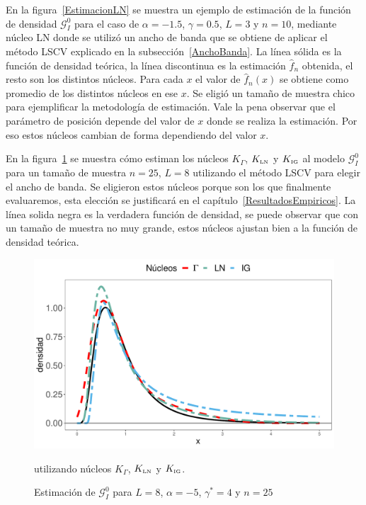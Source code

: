 En la figura~\ref{EstimacionLN} se muestra un ejemplo de estimación de la función de densidad $\mathcal{G}_I^0$ para el caso de $\alpha=-1.5$, $\gamma=0.5$, $L=3$ y $n=10$, mediante núcleo LN donde se utilizó un ancho de banda que se obtiene de aplicar el método LSCV explicado en la subsección~\ref{AnchoBanda}. La línea sólida es la función de densidad teórica, la línea discontinua es la estimación $\widehat{f}_n$ obtenida, el resto son los distintos núcleos. Para cada $x$ el valor de $\widehat{f}_n(x)$ se obtiene como promedio de los distintos núcleos en ese $x$. Se eligió un tamaño de muestra chico para ejemplificar la metodología de estimación. Vale la pena observar que el parámetro de posición depende del valor de $x$ donde se realiza la estimación. Por eso estos núcleos cambian de forma dependiendo del valor $x$.

En la figura~\ref{EstimacionLNyGAyIG} se muestra cómo estiman los núcleos $K_{\Gamma}$, $K_{\text{\tiny{LN}}}$ y $K_{\text{\tiny{IG}}}$ al modelo $\mathcal{G}_I^0$ para un tamaño de muestra $n=25$, $L=8$ utilizando el método LSCV para elegir el ancho de banda. Se eligieron estos núcleos porque son los que finalmente evaluaremos, esta elección se justificará en el capítulo~\ref{ResultadosEmpiricos}. 
La línea solida negra es la verdadera función de densidad, se puede observar que con un tamaño de muestra no muy grande, estos núcleos ajustan bien a la función de densidad teórica.

\begin{figure}[hbt]
	\centering
	\includegraphics[scale=0.5]{../../Figures/Tesis/Capitulo5/NucleosGALNyIG.pdf}
	\caption{\label{EstimacionLNyGAyIG}Estimación de $\mathcal{G}_I^0$ para $L=8$, $\alpha=-5$, $\gamma^*=4$ y $n=25$} utilizando núcleos $K_{\Gamma}$, $K_{\text{\tiny{LN}}}$ y $K_{\text{\tiny{IG}}}$.
\end{figure}

